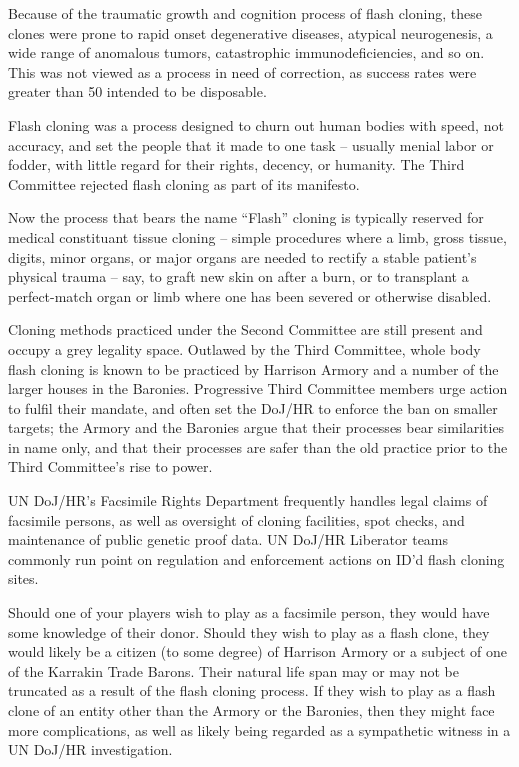 Because of the traumatic growth and cognition process of flash cloning, these clones were prone
to rapid onset degenerative diseases, atypical neurogenesis, a wide range of anomalous tumors,
catastrophic immunodeficiencies, and so on. This was not viewed as a process in need of
correction, as success rates were greater than 50%
intended to be disposable.


Flash cloning was a process designed to churn out human bodies with speed, not accuracy, and
set the people that it made to one task -- usually menial labor or fodder, with little regard for their
rights, decency, or humanity. The Third Committee rejected flash cloning as part of its manifesto.


Now the process that bears the name “Flash” cloning is typically reserved for medical
constituant tissue cloning -- simple procedures where a limb, gross tissue, digits, minor organs,
or major organs are needed to rectify a stable patient’s physical trauma -- say, to graft new skin
on after a burn, or to transplant a perfect-match organ or limb where one has been severed or
otherwise disabled.


Cloning methods practiced under the Second Committee are still present and occupy a grey
legality space. Outlawed by the Third Committee, whole body flash cloning is known to be
practiced by Harrison Armory and a number of the larger houses in the Baronies. Progressive
Third Committee members urge action to fulfil their mandate, and often set the DoJ/HR to
enforce the ban on smaller targets; the Armory and the Baronies argue that their processes bear
similarities in name only, and that their processes are safer than the old practice prior to the Third
Committee’s rise to power.


UN DoJ/HR’s Facsimile Rights Department frequently handles legal claims of facsimile persons,
as well as oversight of cloning facilities, spot checks, and maintenance of public genetic proof
data. UN DoJ/HR Liberator teams commonly run point on regulation and enforcement actions on
ID’d flash cloning sites.





Should one of your players wish to play as a facsimile person, they would have some knowledge
of their donor. Should they wish to play as a flash clone, they would likely be a citizen (to some
degree) of Harrison Armory or a subject of one of the Karrakin Trade Barons. Their natural life
span may or may not be truncated as a result of the flash cloning process. If they wish to play as
a flash clone of an entity other than the Armory or the Baronies, then they might face more
complications, as well as likely being regarded as a sympathetic witness in a UN DoJ/HR
investigation.

